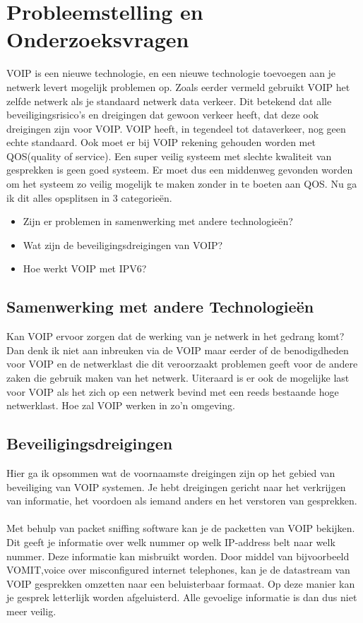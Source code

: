 \documentclass[pdftex,a4paper,12pt,twoside]{report}
\begin{document}
\newpage

\section{Probleemstelling en Onderzoeksvragen}
\label{sec:onderzoeksvragen}
VOIP is een nieuwe technologie, en een nieuwe technologie toevoegen aan je netwerk levert mogelijk problemen op. 
Zoals eerder vermeld gebruikt VOIP het zelfde netwerk als je standaard netwerk data verkeer. Dit betekend dat alle beveiligingsrisico's en dreigingen dat gewoon verkeer heeft, dat deze ook dreigingen zijn voor VOIP. VOIP heeft, in tegendeel tot dataverkeer, nog geen echte standaard. Ook moet er bij VOIP rekening gehouden worden met QOS(quality of service). Een super veilig systeem met slechte kwaliteit van gesprekken is geen goed systeem. Er moet dus een middenweg gevonden worden om het systeem zo veilig mogelijk te maken zonder in te boeten aan QOS.
Nu ga ik dit alles opsplitsen in 3 categorieën.

\begin{itemize}
	\item Zijn er problemen in samenwerking met andere technologieën?
	\item Wat zijn de beveiligingsdreigingen van VOIP?
	\item Hoe werkt VOIP met IPV6?
\end{itemize}

\subsection{Samenwerking met andere Technologieën}

Kan VOIP ervoor zorgen dat de werking van je netwerk in het gedrang komt? Dan denk ik niet aan inbreuken via de VOIP maar eerder of de benodigdheden voor VOIP en de netwerklast die dit veroorzaakt problemen geeft voor de andere zaken die gebruik maken van het netwerk. Uiteraard is er ook de mogelijke last voor VOIP als het zich op een netwerk bevind met een reeds bestaande hoge netwerklast. Hoe zal VOIP werken in zo'n omgeving.

\subsection{Beveiligingsdreigingen}
Hier ga ik opsommen wat de voornaamste dreigingen zijn op het gebied van beveiliging van VOIP systemen. Je hebt dreigingen gericht naar het verkrijgen van informatie, het voordoen als iemand anders en het verstoren van gesprekken. 
\\ \\
Met behulp van packet sniffing software kan je de packetten van VOIP bekijken. Dit geeft je informatie over welk nummer op welk IP-address belt naar welk nummer. Deze informatie kan misbruikt worden. Door middel van bijvoorbeeld VOMIT,voice over misconfigured internet telephones, kan je de datastream van VOIP gesprekken omzetten naar een beluisterbaar formaat. 	Op deze manier kan je gesprek letterlijk worden afgeluisterd. Alle gevoelige informatie is dan dus niet meer veilig.
\end{document}

